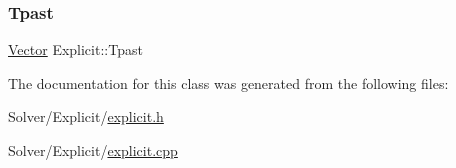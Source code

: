 \subsubsection{\texorpdfstring{Tpast}{Tpast}}
{\footnotesize\ttfamily \hyperlink{class_vector}{Vector} Explicit\+::\+Tpast}



The documentation for this class was generated from the following files\+:\begin{DoxyCompactItemize}
\item 
Solver/\+Explicit/\hyperlink{explicit_8h}{explicit.\+h}\item 
Solver/\+Explicit/\hyperlink{explicit_8cpp}{explicit.\+cpp}\end{DoxyCompactItemize}
